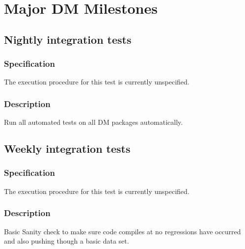 








\section{Major DM Milestones \label{sect:milestones}}

\subsection{Nightly integration tests}

\subsubsection{Specification}
The execution procedure for this test is currently unspecified.
\subsubsection{Description}
Run all automated tests on all DM packages automatically.

\subsection{Weekly integration tests}

\subsubsection{Specification}
The execution procedure for this test is currently unspecified.

\subsubsection{Description}
Basic Sanity check to make sure code compiles at no regressions have occurred
and also pushing though a basic data set.







